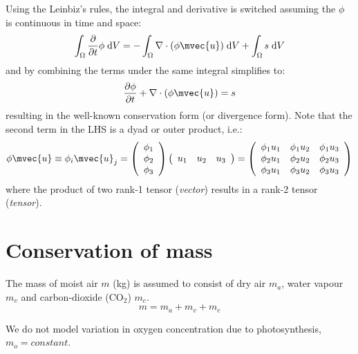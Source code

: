 Using the Leinbiz's rules, the integral and derivative is switched assuming the $\phi$ is continuous in time and space:
\begin{equation}
\int_{\Omega}  \frac{\partial}{\partial t}\phi\;\mathrm{d}V = -\int_{\Omega} \nabla \cdot (\phi\mvec{u})\;\mathrm{d}V + \int_{\Omega} s\;\mathrm{d}V
\end{equation}
and by combining the terms under the same integral simplifies to:
\begin{equation}
\frac{\partial \phi}{\partial t} + \nabla \cdot (\phi\mvec{u}) = s
\end{equation}
resulting in the well-known conservation form (or divergence form). Note that the second term in the LHS is a dyad or outer product, i.e.:
\begin{equation}
\phi {\mvec{u}} \equiv {\phi _i}{\mvec{u}_j} = \left( {\begin{array}{*{20}{c}}
{{\phi _1}}\\
{{\phi _2}}\\
{{\phi _3}}
\end{array}} \right)\left( {\begin{array}{*{20}{c}}
{{u_1}}&{{u_2}}&{{u_3}}
\end{array}} \right) = \left( {\begin{array}{*{20}{c}}
{{\phi _1}{u_1}}&{{\phi _1}{u_2}}&{{\phi _1}{u_3}}\\
{{\phi _2}{u_1}}&{{\phi _2}{u_2}}&{{\phi _2}{u_3}}\\
{{\phi _3}{u_1}}&{{\phi _3}{u_2}}&{{\phi _3}{u_3}}
\end{array}} \right)
\end{equation}
where the product of two rank-1 tensor (\textit{vector}) results in a rank-2 tensor (\textit{tensor}).

\section{Conservation of mass}

The mass of moist air $m$ (kg) is assumed to consist of dry air $m_a$, water vapour $m_v$ and carbon-dioxide (CO$_2$) $m_{c}$.
\begin{equation}
m = m_a + m_v + m_{c}
\end{equation}

\begin{assumption}
	We do not model variation in oxygen concentration due to photosynthesis, $m_o = \textit{constant}$.
\end{assumption}

